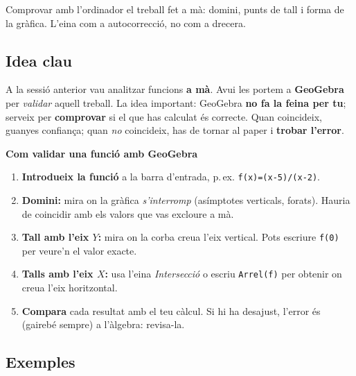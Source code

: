 %
{Comprovar amb l'ordinador el treball fet a mà: domini, punts de tall i forma de la gràfica. L'eina com a autocorrecció, no com a drecera.}

\subsection{Idea clau}

A la sessió anterior vau analitzar funcions \textbf{a mà}. Avui les portem a
\textbf{GeoGebra} per \emph{validar} aquell treball. La idea important: GeoGebra
\textbf{no fa la feina per tu}; serveix per \textbf{comprovar} si el que has calculat
és correcte. Quan coincideix, guanyes confiança; quan \emph{no} coincideix, has de
tornar al paper i \textbf{trobar l'error}.

\begin{idea}
\textbf{Com validar una funció amb GeoGebra}
\begin{enumerate}[leftmargin=1.6em, itemsep=2pt]
  \item \textbf{Introdueix la funció} a la barra d'entrada, p.\,ex. \texttt{f(x)=(x-5)/(x-2)}.
  \item \textbf{Domini:} mira on la gràfica \emph{s'interromp} (asímptotes verticals,
        forats). Hauria de coincidir amb els valors que vas excloure a mà.
  \item \textbf{Tall amb l'eix $Y$:} mira on la corba creua l'eix vertical. Pots
        escriure \texttt{f(0)} per veure'n el valor exacte.
  \item \textbf{Talls amb l'eix $X$:} usa l'eina \emph{Intersecció} o escriu
        \texttt{Arrel(f)} per obtenir on creua l'eix horitzontal.
  \item \textbf{Compara} cada resultat amb el teu càlcul. Si hi ha desajust, l'error
        és (gairebé sempre) a l'àlgebra: revisa-la.
\end{enumerate}
\end{idea}

\subsection{Exemples}

